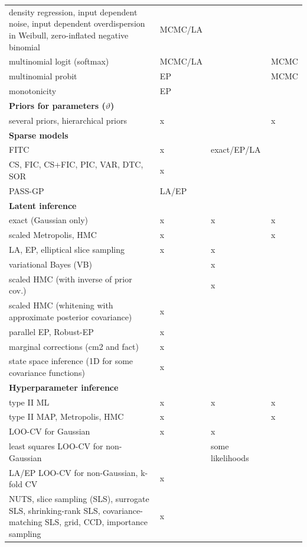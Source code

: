 \documentclass[twoside,11pt]{article}
\begin{document}
\begin{table}
\begin{tabular}{p{9.5cm}p{2.3cm}p{2.1cm}p{0.9cm}}
    density regression, input dependent noise, input dependent overdispersion in Weibull,
    zero-inflated negative binomial  & MCMC/LA &  &  \\
    multinomial logit (softmax) & MCMC/LA & & MCMC \\
    multinomial probit & EP & & MCMC \\
    monotonicity & EP & & \\
    \multicolumn{4}{l}{\textbf{Priors for parameters ($\vartheta$)}}  \\
    \hline
    several priors, hierarchical priors & x & & x \\
    \multicolumn{4}{l}{\textbf{Sparse models}} \\
    \hline
    FITC & x & exact/EP/LA & \\
    CS, FIC, CS+FIC, PIC, VAR, DTC, SOR & x &  & \\
    PASS-GP & LA/EP & & \\
    \multicolumn{4}{l}{\textbf{Latent inference}} \\
    \hline
    exact (Gaussian only) & x & x & x  \\
    scaled Metropolis, HMC & x &  & x \\
    LA, EP, elliptical slice sampling   & x & x & \\
    variational Bayes (VB) & & x & \\
    scaled HMC (with inverse of prior cov.) &  & x & \\
    scaled HMC (whitening with approximate posterior covariance) & x  &  & \\
    parallel EP, Robust-EP  & x & & \\
    marginal corrections (cm2 and fact) & x & & \\
    state space inference (1D for some covariance functions) & x & & \\
    \multicolumn{4}{l}{\textbf{Hyperparameter inference}} \\
    \hline
    type II ML  & x & x & x \\
    type II MAP, Metropolis, HMC  & x & & x \\
    LOO-CV for Gaussian & x & x & \\
    least squares LOO-CV for non-Gaussian & & some likelihoods &\\
    LA/EP LOO-CV for non-Gaussian, k-fold CV & x & & \\
    \hangindent=0.3cm NUTS, slice sampling (SLS), surrogate SLS,
    shrinking-rank SLS, covariance-matching SLS, grid, CCD, importance sampling  & x & & \\

\end{tabular}
\end{table}
\end{document}
